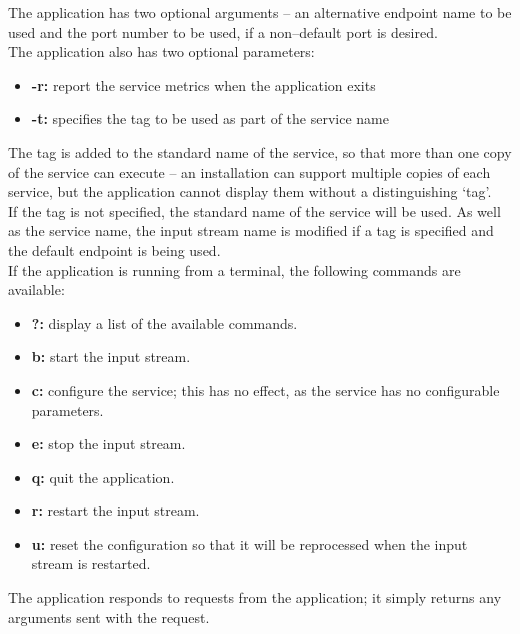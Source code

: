 The application has two optional arguments -- an alternative endpoint name to be used and
the port number to be used, if a non--default port is desired.\\

The application also has two optional parameters:
\begin{itemize}
\item \textbf{-r:} report the service metrics when the application exits
\item \textbf{-t:} specifies the tag to be used as part of the service name
\end{itemize}
The tag is added to the standard name of the service, so that more than one copy of the
service can execute -- an \mplusm{} installation can support multiple copies of each
 service, but the 
application cannot display them without a distinguishing `tag'.\\
If the tag is not specified, the standard name of the service will be used.
As well as the service name, the input stream name is modified if a tag is specified and
the default endpoint is being used.\\

If the application is running from a terminal, the following commands are available:
\begin{itemize}
\item \textbf{?:} display a list of the available commands.
\item \textbf{b:} start the input stream. 
\item \textbf{c:} configure the service; this has no effect, as the service has no
configurable parameters. 
\item \textbf{e:} stop the input stream. 
\item \textbf{q:} quit the application. 
\item \textbf{r:} restart the input stream.
\item \textbf{u:} reset the configuration so that it will be reprocessed when the input
stream is restarted. 
\end{itemize}
The  application responds to
 requests from the
 application; it simply returns any arguments
sent with the request.\\

